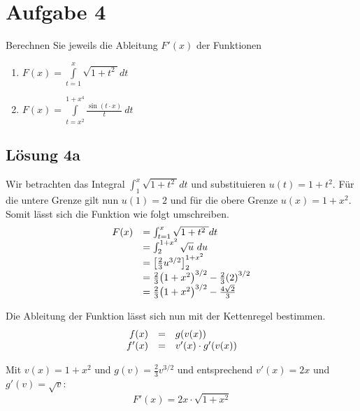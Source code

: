 \documentclass[main.tex]{subfiles}
\begin{document}
\section{Aufgabe 4}

Berechnen Sie jeweils die Ableitung $F'( x)$ der Funktionen

\begin{enumerate}
    \item $F( x) =\int\limits _{t=1}^{x}\sqrt{1+t^{2} \ } dt$
    \item $F( x) =\int\limits _{t=x^{2}}^{1+x^{4}}\frac{\sin( t\cdotp x)}{t} \ dt$
\end{enumerate}

\subsection{Lösung 4a}
Wir betrachten das Integral $\int\nolimits _{1}^{x}\sqrt{1+t^{2} \ } dt$ und substituieren $u( t) =1+t^{2}$. Für die untere Grenze gilt nun $u( 1) =2$ und für die obere Grenze $u( x) =1+x^{2}$. Somit lässt sich die Funktion wie folgt umschreiben.
\begin{equation*}
    \begin{array}{ c l }
        F( x) & =\int\nolimits _{t=1}^{x}\sqrt{1+t^{2} \ } dt\\
        & =\int\nolimits _{2}^{1+x^{2}}\sqrt{u} \ du\\
        & =\left[\frac{2}{3} u^{3/2}\right]_{2}^{1+x^{2}}\\
        & =\frac{2}{3}{\left( 1+x^{2}\right)}^{3/2} -\frac{2}{3}{(2)}^{3/2}\\
        & =\frac{2}{3}{\left( 1+x^{2}\right)}^{3/2} -\frac{4\sqrt{2}}{3}
    \end{array}
\end{equation*}

Die Ableitung der Funktion lässt sich nun mit der Kettenregel bestimmen.
\begin{equation*}
    \begin{array}{ r c l }
        f( x) & = & g( v( x))\\
        f'( x) & = & v'( x) \cdotp g'( v( x))
    \end{array}
\end{equation*}

Mit $v( x) =1+x^{2}$ und $g( v) =\frac{2}{3} v^{3/2}$ und entsprechend $v'( x) =2x$ und $g'( v) =\sqrt{v}$:
\begin{equation*}
    F'( x) =2x\cdotp \sqrt{1+x^{2}}
\end{equation*}
\end{document}
